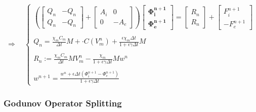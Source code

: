 \documentclass[a4paper]{article}
\begin{document}
\begin{equation}
\Rightarrow \quad
\begin{cases}
\left(
\begin{bmatrix} Q_n & -Q_n \\ Q_n & -Q_n \end{bmatrix} + 
\begin{bmatrix} A_i & 0 \\ 0 & -A_e\end{bmatrix}
\right)
\begin{bmatrix}
\bm{\Phi_i^{n+1}} \\ \bm{\Phi_e^{n+1}}
\end{bmatrix}
= \begin{bmatrix} R_n \\ R_n \end{bmatrix} + \begin{bmatrix} F_i^{n+1} \\  -F_e^{n+1}\end{bmatrix} \\ \\
Q_n = \frac{\displaystyle \chi_m C_m}{\displaystyle \Delta t}M +  \cdot C(V_m^n) + \frac{\displaystyle \epsilon\chi_m \Delta t}{\displaystyle 1 + \epsilon \gamma \Delta t}M \\ \\
R_n := \frac{\displaystyle \chi_mC_m}{\displaystyle \Delta t}MV_m^n - \frac{\displaystyle \chi_m}{\displaystyle 1+\epsilon\gamma\Delta t}M w^n \\ \\
w^{n+1} = \frac{\displaystyle w^n + \epsilon \Delta t (\Phi_i^{n+1}-\Phi_e^{n+1})}{\displaystyle 1+\epsilon \gamma \Delta t}
\end{cases}
\end{equation}


\vspace{5mm}
\subsubsection{Godunov Operator Splitting}
\end{document}
